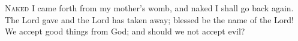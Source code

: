 
\lettrine{N}{aked} I came forth from my mother’s womb,
   and naked I shall go back again.
The Lord gave and the Lord has taken away;
   blessed be the name of the Lord!
We accept good things from God;
   and should we not accept evil?